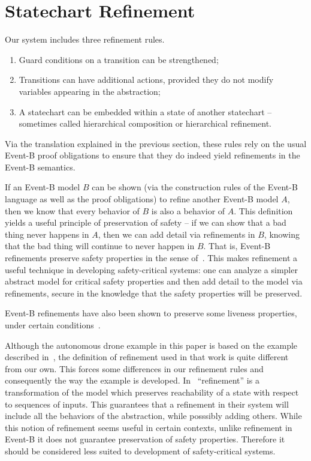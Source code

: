 
\section{Statechart Refinement}
\label{sec:scref}

Our system includes three refinement rules.

\begin{enumerate}
\item Guard conditions on a transition can be strengthened;
\item Transitions can have additional actions, provided they do not
  modify variables appearing in the abstraction;
\item A statechart can be embedded within a state of another
  statechart -- sometimes called hierarchical composition or
  hierarchical refinement.
\end{enumerate}

Via the translation explained in the previous section, these rules
rely on the usual Event-B proof obligations to ensure that they do
indeed yield refinements in the Event-B semantics.

If an Event-B model $B$ can be shown (via the construction rules of
the Event-B language as well as the proof obligations) to refine
another Event-B model $A$, then we know that every behavior of $B$ is
also a behavior of $A$. This definition yields a useful principle of
preservation of safety -- if we can show that a bad thing never
happens in $A$, then we can add detail via refinements in $B$, knowing
that the bad thing will continue to never happen in $B$. That is,
Event-B refinements preserve safety properties in the sense
of~\cite{lamport1977proving}. This makes refinement a useful technique
in developing safety-critical systems: one can analyze a simpler
abstract model for critical safety properties and then add detail to
the model via refinements, secure in the knowledge that the safety
properties will be preserved.

Event-B refinements have also been shown to preserve some liveness
properties, under certain conditions~\cite{hoang2016ltl}.

Although the autonomous drone example in this paper is based on the
example described in~\cite{Syriani_2019}, the definition of refinement
used in that work is quite different from our own. This forces some
differences in our refinement rules and consequently the way the
example is developed. In~\cite{Syriani_2019} ``refinement'' is a
transformation of the model which preserves reachability of a state
with respect to sequences of inputs. This guarantees that a refinement
in their system will include all the behaviors of the abstraction,
while posssibly adding others. While this notion of refinement seems
useful in certain contexts, unlike refinement in Event-B it does not
guarantee preservation of safety properties. Therefore it should be
considered less suited to development of safety-critical systems.

